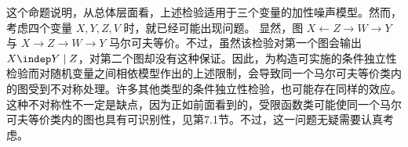 这个命题说明，从总体层面看，上述检验适用于三个变量的加性噪声模型。然而，考虑四个变量 $X,Y,Z,V$ 时，就已经可能出现问题。
显然，图 $X\leftarrow Z\to W\to Y$ 与 $X\to Z\to W\to Y$ 马尔可夫等价。不过，虽然该检验对第一个图会输出 $X\indep Y\mid Z$，对第二个图却没有这种保证。因此，为构造可实施的条件独立性检验而对随机变量之间相依模型作出的上述限制，会导致同一个马尔可夫等价类内的图受到不对称处理。许多其他类型的条件独立性检验，也可能存在同样的效应。这种不对称性不一定是缺点，因为正如前面看到的，受限函数类可能使同一个马尔可夫等价类内的图也具有可识别性，见第7.1节。不过，这一问题无疑需要认真考虑。
